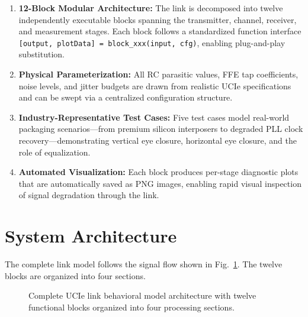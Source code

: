 \documentclass[conference]{IEEEtran}
\begin{document}
\begin{enumerate}
    \item \textbf{12-Block Modular Architecture:} The link is decomposed into twelve independently executable blocks spanning the transmitter, channel, receiver, and measurement stages. Each block follows a standardized function interface \texttt{[output, plotData] = block\_xxx(input, cfg)}, enabling plug-and-play substitution.
    
    \item \textbf{Physical Parameterization:} All RC parasitic values, FFE tap coefficients, noise levels, and jitter budgets are drawn from realistic UCIe specifications and can be swept via a centralized configuration structure.
    
    \item \textbf{Industry-Representative Test Cases:} Five test cases model real-world packaging scenarios---from premium silicon interposers to degraded PLL clock recovery---demonstrating vertical eye closure, horizontal eye closure, and the role of equalization.
    
    \item \textbf{Automated Visualization:} Each block produces per-stage diagnostic plots that are automatically saved as PNG images, enabling rapid visual inspection of signal degradation through the link.
\end{enumerate}

\section{System Architecture}

The complete link model follows the signal flow shown in Fig.~\ref{fig:arch}. The twelve blocks are organized into four sections.

\begin{figure}[h]
\centering
{}
\caption{Complete UCIe link behavioral model architecture with twelve functional blocks organized into four processing sections.}
\label{fig:arch}
\end{figure}
\end{document}
